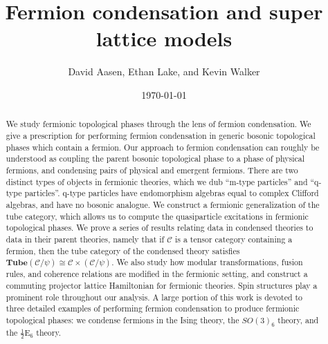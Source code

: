 \documentclass[12pt,a4paper]{article}
\newcommand{\mcc}{\mathcal{C}}
\newcommand{\tube}{\textbf{Tube}}
\newcommand{\halfesix}{\frac{1}{2}\text{E}_6}
\begin{document}
\title{Fermion condensation and super lattice models} %
\author{David Aasen, Ethan Lake, and Kevin Walker}

\date{\today}

\maketitle

\begin{abstract}
We study fermionic topological phases through the lens of fermion condensation. 
We give a prescription for performing fermion condensation in generic 
bosonic topological phases which contain a fermion. 
Our approach to fermion condensation can roughly be understood 
as coupling the parent bosonic topological phase to a phase of physical fermions, and condensing 
pairs of physical and emergent fermions. 
There are two distinct types of objects in fermionic theories, which we dub ``m-type particles'' and ``q-type particles''. 
q-type particles have endomorphism algebras equal to complex Clifford algebras, and 
have no bosonic analogue. 
We construct a fermionic generalization of the tube category, which allows us to compute
the quasiparticle excitations in fermionic topological phases. 
We prove a series of results relating data in condensed theories to data in their parent theories, 
namely that if $\mcc$ is a tensor category containing a fermion, then the tube category 
of the condensed theory satisfies 
$\tube(\mcc/\psi) \cong \mcc \times (\mcc/\psi)$.  
We also study how modular transformations, fusion rules, and coherence relations 
are modified in the fermionic setting, and construct 
a commuting projector lattice Hamiltonian for fermionic theories.  
Spin structures play a prominent role throughout our analysis. 
A large portion of this work is devoted to three detailed examples of performing fermion condensation to produce fermionic topological phases: we condense fermions 
in the Ising theory, the $SO(3)_6$ theory, and the $\halfesix$ theory. 
\end{abstract}

\tableofcontents
\end{document}
